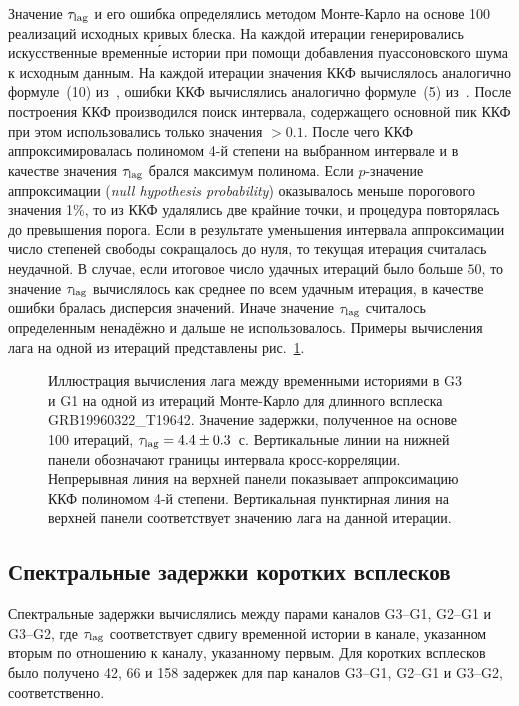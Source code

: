 Значение $\tau_{\mathrm{lag}}$ и его ошибка определялись методом Монте-Карло на основе 
100 реализаций исходных кривых блеска. 
На каждой итерации генерировались искусственные временн\'{ы}е истории 
при помощи добавления пуассоновского шума к исходным данным.
На каждой итерации значения ККФ вычислялось аналогично формуле~(10) из~\citep{Band_1997ApJ}, 
ошибки ККФ вычислялись аналогично формуле~(5) из~\citep{Fenimore_1995}.
После построения ККФ производился поиск интервала, содержащего основной пик ККФ
при этом использовались только значения $>0.1$.  
После чего ККФ аппроксимировалась полиномом 4-й степени на выбранном интервале
и в качестве значения $\tau_{\mathrm{lag}}$ брался максимум полинома.
Если $p$-значение аппроксимации (\textit{null hypothesis probability}) 
оказывалось меньше порогового значения 1\%, 
то из ККФ удалялись две крайние точки, и процедура повторялась до превышения порога. 
Если в результате уменьшения интервала аппроксимации число степеней свободы сокращалось до нуля,
то текущая итерация считалась неудачной. 
В случае, если итоговое число удачных итераций было больше $50$, то значение $\tau_{\mathrm{lag}}$ 
вычислялось как среднее по всем удачным итерация, в качестве ошибки бралась дисперсия значений.
Иначе значение $\tau_{\mathrm{lag}}$ считалось определенным ненадёжно и дальше не использовалось.
Примеры вычисления лага на одной из итераций представлены рис.~\ref{fig:lag_calculation}.

\begin{figure}[h]
  \caption{Иллюстрация вычисления лага между временными историями в G3 и G1 
  на одной из итераций Монте-Карло для длинного всплеска GRB19960322\_T19642. 
  Значение задержки, полученное на основе 100 итераций,  $\tau_{\mathrm{lag}}=4.4\pm0.3$~с. 
  Вертикальные линии на нижней панели обозначают границы интервала кросс-корреляции. 
  Непрерывная линия на верхней панели показывает аппроксимацию ККФ полиномом 4-й степени. 
  Вертикальная пунктирная линия на верхней панели соответствует значению лага на данной итерации.
  \label{fig:lag_calculation}}  
\end{figure}

\subsection{Спектральные задержки коротких всплесков}
Спектральные задержки вычислялись между парами каналов G3--G1, G2--G1 и G3--G2, 
где $\tau_{\mathrm{lag}}$ соответствует сдвигу временной истории в канале, указанном вторым
по отношению к каналу, указанному первым. Для коротких всплесков было получено
42, 66 и 158 задержек для пар каналов G3--G1, G2--G1 и G3--G2, соответственно.

